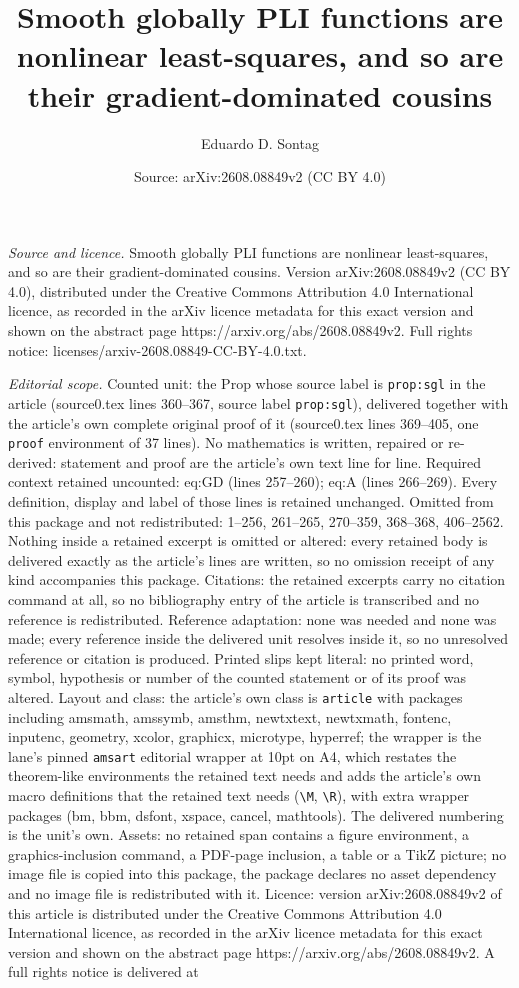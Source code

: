 \documentclass[10pt,a4paper]{amsart}
\title[Smooth globally PLI functions are nonlinear least-squares, a]{Smooth globally PLI functions are nonlinear least-squares, and so are their gradient-dominated cousins}
\author{Eduardo D. Sontag}
\date{Source: arXiv:2608.08849v2 (CC BY 4.0)}
\begin{document}
\maketitle

\noindent\emph{Source and licence.} Smooth globally PLI functions are nonlinear least-squares, and so are their gradient-dominated cousins. Version arXiv:2608.08849v2 (CC BY 4.0), distributed under the Creative Commons Attribution 4.0 International licence, as recorded in the arXiv licence metadata for this exact version and shown on the abstract page https://arxiv.org/abs/2608.08849v2. Full rights notice: licenses/arxiv-2608.08849-CC-BY-4.0.txt.\par\smallskip

\noindent\textit{Editorial scope.} Counted unit: the Prop whose source label is \texttt{prop:sgl} in the article (source0.tex lines 360--367, source label \texttt{prop:sgl}), delivered together with the article's own complete original proof of it (source0.tex lines 369--405, one \texttt{proof} environment of 37 lines). No mathematics is written, repaired or re-derived: statement and proof are the article's own text line for line. Required context retained uncounted: eq:GD (lines 257--260); eq:A (lines 266--269). Every definition, display and label of those lines is retained unchanged. Omitted from this package and not redistributed: 1--256, 261--265, 270--359, 368--368, 406--2562. Nothing inside a retained excerpt is omitted or altered: every retained body is delivered exactly as the article's lines are written, so no omission receipt of any kind accompanies this package. Citations: the retained excerpts carry no citation command at all, so no bibliography entry of the article is transcribed and no reference is redistributed. Reference adaptation: none was needed and none was made; every reference inside the delivered unit resolves inside it, so no unresolved reference or citation is produced. Printed slips kept literal: no printed word, symbol, hypothesis or number of the counted statement or of its proof was altered. Layout and class: the article's own class is \texttt{article} with packages including amsmath, amssymb, amsthm, newtxtext, newtxmath, fontenc, inputenc, geometry, xcolor, graphicx, microtype, hyperref; the wrapper is the lane's pinned \texttt{amsart} editorial wrapper at 10pt on A4, which restates the theorem-like environments the retained text needs and adds the article's own macro definitions that the retained text needs (\texttt{\textbackslash M}, \texttt{\textbackslash R}), with extra wrapper packages (bm, bbm, dsfont, xspace, cancel, mathtools). The delivered numbering is the unit's own. Assets: no retained span contains a figure environment, a graphics-inclusion command, a PDF-page inclusion, a table or a TikZ picture; no image file is copied into this package, the package declares no asset dependency and no image file is redistributed with it. Licence: version arXiv:2608.08849v2 of this article is distributed under the Creative Commons Attribution 4.0 International licence, as recorded in the arXiv licence metadata for this exact version and shown on the abstract page https://arxiv.org/abs/2608.08849v2. A full rights notice is delivered at 
\end{document}
